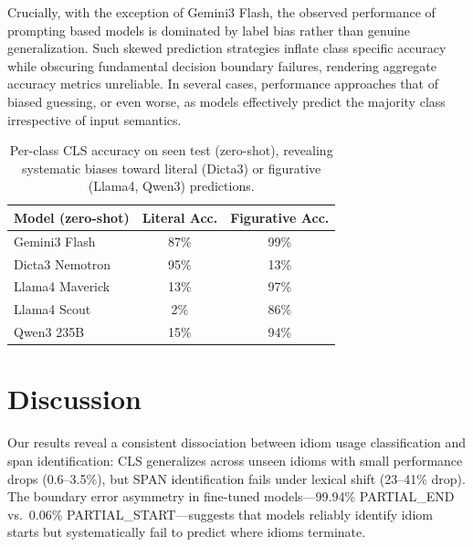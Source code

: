 \documentclass[11pt]{article}
\begin{document}
Crucially, with the exception of Gemini3 Flash, the observed performance of prompting based models is dominated by label bias rather than genuine generalization.
Such skewed prediction strategies inflate class specific accuracy while obscuring fundamental decision boundary failures, rendering aggregate accuracy metrics unreliable.
In several cases, performance approaches that of biased guessing, or even worse, as models effectively predict the majority class irrespective of input semantics.



\begin{table}[t]
\centering
\small
\begin{tabular}{lcc}
\toprule
\textbf{Model (zero-shot)} & \textbf{Literal Acc.} & \textbf{Figurative Acc.} \\
\midrule
Gemini3 Flash & 87\% & 99\% \\
Dicta3 Nemotron & 95\% & 13\% \\
Llama4 Maverick & 13\% & 97\% \\
Llama4 Scout & 2\% & 86\% \\
Qwen3 235B & 15\% & 94\% \\
\bottomrule
\end{tabular}
\caption{Per-class CLS accuracy on seen test (zero-shot), revealing systematic biases toward literal (Dicta3) or figurative (Llama4, Qwen3) predictions.}
\label{tab:prompting_bias}
\end{table}

\section{Discussion}

Our results reveal a consistent dissociation between idiom usage classification and span identification: CLS generalizes across unseen idioms with small performance drops (0.6--3.5\%), but SPAN identification fails under lexical shift (23--41\% drop). The boundary error asymmetry in fine-tuned models---99.94\% PARTIAL\_END vs.\ 0.06\% PARTIAL\_START---suggests that models reliably identify idiom starts but systematically fail to predict where idioms terminate.
\end{document}
